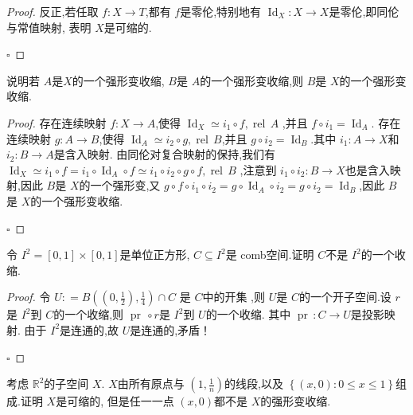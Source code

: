 \documentclass[../../几何与拓扑.tex]{subfiles}
\begin{document}
\begin{problemset}
\begin{proof}
        
        反正,若任取 \(  f: X \to T  \),都有 \(  f  \)是零伦,特别地有 \(  \operatorname{Id}_{X}: X \to X  \)是零伦,即同伦与常值映射, 表明 \(  X  \)是可缩的.    
    
        \hfill $\square$
    \end{proof}
    
    \item 说明若 \(  A  \)是\(  X  \)的一个强形变收缩, \(  B  \)是 \(  A  \)的一个强形变收缩,则 \(  B  \)是 \(  X  \)的一个强形变收缩.
    
    \begin{proof}
        存在连续映射 \(  f : X\to A \),使得 \(  \operatorname{Id}_{X}\simeq i_1\circ f, \operatorname{rel}\,A \) ,并且 \( f\circ i_1=  \operatorname{Id}_{A}  \).  
        存在连续映射 \(  g:  A \to B \),使得 \(  \operatorname{Id}_{A}\simeq  i_2\circ g, \operatorname{rel}\,B  \),并且 \(  g\circ i_2 = \operatorname{Id}_{B} \).其中 \(  i_1: A \to X  \)和 \(  i_2: B\to A  \)是含入映射.
        由同伦对复合映射的保持,我们有 \(  \operatorname{Id}_{X}\simeq  i_1\circ f =  i_1 \circ \operatorname{Id}_{A}\circ f \simeq i_1\circ i_2\circ g\circ f ,\operatorname{rel}\,B\) ,注意到 \(  i_1\circ i_2: B\to X  \)也是含入映射,因此 \(  B  \)是 \(  X  \)的一个强形变,又 
        \(  g\circ f\circ i_1\circ i_2=  g\circ \operatorname{Id}_{A}\circ i_2= g\circ i_2=  \operatorname{Id}_{B}  \),因此 \(  B  \)是 \(  X  \)的一个强形变收缩.   

        
    
        \hfill $\square$
    \end{proof}
    \item   令 \(  I ^{2} =  \left[ 0,1 \right]\times \left[ 0,1 \right]    \)是单位正方形, \(  C\subseteq I^{2}  \)是 comb空间.证明 \(  C  \)不是 \(  I^{2}  \)的一个收缩.
    \begin{proof}
    
        令 \(  U: =  B\left( \left( 0,\frac{1}{2} \right),\frac{1}{4}  \right)   \cap C\) 是 \(  C  \)中的开集 ,则 \(  U  \)是 \(  C  \)的一个开子空间.设 \(  r  \)是 \(  I^{2}  \)到 \(  C  \)的一个收缩,则 \(  \operatorname{pr}\,\circ r  \)是 \(  I^{2}  \)到 \(  U  \)的一个收缩.
        其中 \(  \operatorname{pr}\,: C \to U  \)是投影映射. 由于 \(  I^{2}  \)是连通的,故 \(  U  \)是连通的,矛盾！    
    
        \hfill $\square$
    \end{proof} 
    \item 考虑 \(  \mathbb{R} ^{2}  \)的子空间 \(  X  \). \(  X  \)由所有原点与 \(  \left( 1, \frac{1}{n} \right)   \)的线段,以及 \(  \left\{ \left( x,0 \right)  : 0 \le  x \le  1\right\}  \)组成.证明 \(  X  \)是可缩的,
    但是任一一点  \(  \left( x,0 \right)   \)都不是 \(  X  \)的强形变收缩. 
    

\end{problemset}
\end{document}
